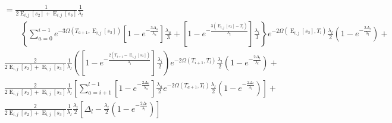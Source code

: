 \documentclass{article}
\DeclareMathOperator{\E}{E}
\begin{document}
\begin{align*}
    &=\frac{1}{2\E_{i,j}[s_2]+\E_{i,j}[s_3]}\frac{1}{\lambda_l}\\
    &\qquad\left\{\sum_{a=0}^{i-1}e^{-3\Omega(T_{a+1},\E_{i,j}[s_3])}
    \left[1-e^{-\frac{3\Delta_a}{\lambda_a}}\right]\frac{\lambda_a}{3}+
    \left[1-e^{-\frac{3\left(\E_{i,j}[s_3]-T_{i}\right)}{\lambda_{i}}}\right]
\frac{\lambda_{i}}{3}\right\}e^{-2\Omega(\E_{i,j}[s_3],T_l)}\frac{\lambda_l}{2}\left(1-e^{-\frac{2\Delta_l}{\lambda_l}}\right)+\\
    &\frac{2}{2\E_{i,j}[s_2]+\E_{i,j}[s_3]}\frac{1}{\lambda_{l}}
    \left(\left[1-e^{-\frac{2\left(T_{i+1}-\E_{i,j}[s_3]\right)}{\lambda_{i}}}\right]
    \frac{\lambda_{i}}{2}\right)e^{-2\Omega(T_{i+1},T_l)}\frac{\lambda_l}{2}\left(1-e^{-\frac{2\Delta_l}{\lambda_l}}\right)+\\
    &\frac{2}{2\E_{i,j}[s_2]+\E_{i,j}[s_3]}\frac{1}{\lambda_{l}}
    \left[\sum_{a=i+1}^{l-1}\left[1-e^{-\frac{2\Delta_a}{\lambda_a}}\right]\frac{\lambda_a}{2}
    e^{-2\Omega(T_{a+1},T_l)}\frac{\lambda_l}{2}\left(1-e^{-\frac{2\Delta_l}{\lambda_l}}\right)\right]+\\
    &\frac{2}{2\E_{i,j}[s_2]+\E_{i,j}[s_3]}\frac{1}{\lambda_{l}}
    \frac{\lambda_{l}}{2}\left[\Delta_l-\frac{\lambda_l}{2}\left(1-e^{-\frac{2\Delta_l}{\lambda_l}}\right)\right]
    \\
\end{align*}
\end{document}
